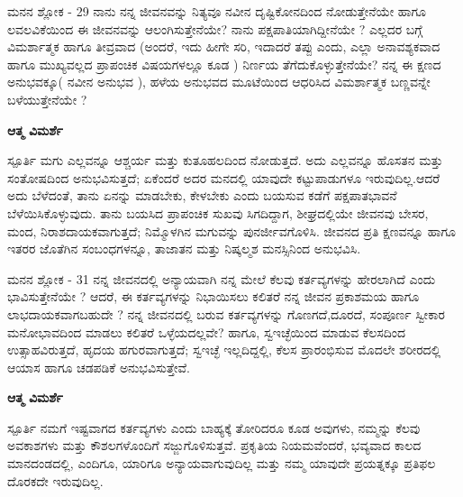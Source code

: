 \begin{mananam}{\mananamfont ಮನನ ಶ್ಲೋಕ - \textenglish{29}}
\footnotesize \mananamtext ನಾನು ನನ್ನ ಜೀವನವನ್ನು ನಿತ್ಯವೂ ನವೀನ ದೃಷ್ಟಿಕೋನದಿಂದ ನೋಡುತ್ತೇನೆಯೇ ಹಾಗೂ ಲವಲವಿಕೆಯಿಂದ ಈ ಜೀವನವನ್ನು ಆಲಂಗಿಸುತ್ತೇನೆಯೇ? ನಾನು ಪಕ್ಷಪಾತಿಯಾಗಿದ್ದೀನೆಯೇ ? ಎಲ್ಲದರ ಬಗ್ಗೆ ವಿಮರ್ಶಾತ್ಮಕ ಹಾಗೂ ತೀವ್ರವಾದ (ಅಂದರೆ, ಇದು ಹೀಗೇ ಸರಿ, ಇದಾದರೆ ತಪ್ಪು ಎಂದು, ಎಲ್ಲಾ ಅನಾವಶ್ಯಕವಾದ ಹಾಗೂ ಮುಖ್ಯವಲ್ಲದ ಪ್ರಾಪಂಚಿಕ ವಿಷಯಗಳಲ್ಲೂ ಕೂಡ ) ನಿರ್ಣಯ ತೆಗೆದುಕೊಳ್ಳುತ್ತೇನೆಯೇ? ನನ್ನ ಈ ಕ್ಷಣದ ಅನುಭವಕ್ಕೂ( ನವೀನ ಅನುಭವ ), ಹಳೆಯ  ಅನುಭವದ ಮೂಟೆಯಿಂದ ಆಧರಿಸಿದ ವಿಮರ್ಶಾತ್ಮಕ ಬಣ್ಣವನ್ನೇ ಬಳೆಯುತ್ತೇನೆಯೇ ?
\end{mananam}
\WritingHand\enspace\textbf{ಆತ್ಮ ವಿಮರ್ಶೆ}
\begin{inspiration}{\mananamfont ಸ್ಪೂರ್ತಿ}
\footnotesize \mananamtext ಮಗು ಎಲ್ಲವನ್ನೂ ಆಶ್ಚರ್ಯ ಮತ್ತು ಕುತೂಹಲದಿಂದ ನೋಡುತ್ತದೆ. ಅದು ಎಲ್ಲವನ್ನೂ ಹೊಸತನ ಮತ್ತು ಸಂತೋಷದಿಂದ ಅನುಭವಿಸುತ್ತದೆ; ಏಕೆಂದರೆ ಅದರ ಮನದಲ್ಲಿ ಯಾವುದೇ ಕಟ್ಟುಪಾಡುಗಳೂ ಇರುವುದಿಲ್ಲ.ಆದರೆ ಅದು ಬೆಳೆದಂತೆ, ತಾನು ಏನನ್ನು ಮಾಡಬೇಕು, ಕೇಳಬೇಕು ಎಂದು ಬಯಸುವ ಕಡೆಗೆ ಪಕ್ಷಪಾತಭಾವನೆ ಬೆಳೆಯಿಸಿಕೊಳ್ಳುವುದು. ತಾನು ಬಯಸಿದ ಪ್ರಾಪಂಚಿಕ ಸುಖವು ಸಿಗದಿದ್ದಾಗ,  ಶೀಘ್ರದಲ್ಲಿಯೇ ಜೀವನವು ಬೇಸರ, ಮಂದ, ನಿರಾಶದಾಯಕವಾಗುತ್ತದೆ; ನಿಮ್ಮೊಳಗಿನ ಮಗುವನ್ನು ಪುನರ್ಜೀವಗೊಳಿಸಿ. ಜೀವನದ ಪ್ರತಿ ಕ್ಷಣವನ್ನೂ ಹಾಗೂ ಇತರರ ಜೊತೆಗಿನ ಸಂಬಂಧಗಳನ್ನೂ, ತಾಜಾತನ ಮತ್ತು ನಿಷ್ಕಲ್ಮಶ ಮನಸ್ಸಿನಿಂದ ಅನುಭವಿಸಿ.
\end{inspiration}
\newpage

\begin{mananam}{\mananamfont ಮನನ ಶ್ಲೋಕ - \textenglish{31}}
\footnotesize \mananamtext ನನ್ನ ಜೀವನದಲ್ಲಿ ಅನ್ಯಾಯವಾಗಿ ನನ್ನ ಮೇಲೆ ಕೆಲವು ಕರ್ತವ್ಯಗಳನ್ನು ಹೇರಲಾಗಿದೆ ಎಂದು ಭಾವಿಸುತ್ತೇನೆಯೇ ? ಆದರೆ, ಈ ಕರ್ತವ್ಯಗಳನ್ನು ನಿಭಾಯಿಸಲು ಕಲಿತರೆ ನನ್ನ ಜೀವನ ಪ್ರಕಾಶಮಯ ಹಾಗೂ ಲಾಭದಾಯಕವಾಗಬಹುದೇ ? ನನ್ನ ಜೀವನದಲ್ಲಿ ಬರುವ ಕರ್ತವ್ಯಗಳನ್ನು ಗೊಣಗದೆ,ದೂರದೆ, ಸಂಪೂರ್ಣ ಸ್ವೀಕಾರ ಮನೋಭಾವದಿಂದ ಮಾಡಲು ಕಲಿತರೆ ಒಳ್ಳೆಯದಲ್ಲವೇ? ಹಾಗೂ, ಸ್ವಇಚ್ಛೆಯಿಂದ ಮಾಡುವ ಕೆಲಸದಿಂದ ಉತ್ಸಾಹವಿರುತ್ತದೆ, ಹೃದಯ ಹಗುರವಾಗುತ್ತದೆ; ಸ್ವಇಚ್ಛೆ ಇಲ್ಲದಿದ್ದಲ್ಲಿ, ಕೆಲಸ ಪ್ರಾರಂಭಿಸುವ  ಮೊದಲೇ ಶರೀರದಲ್ಲಿ ಆಯಾಸ ಹಾಗೂ ಚಡಪಡಿಕೆ ಅನುಭವಿಸುತ್ತೇವೆ. 
\end{mananam}
\WritingHand\enspace\textbf{ಆತ್ಮ ವಿಮರ್ಶೆ}
\begin{inspiration}{\mananamfont ಸ್ಪೂರ್ತಿ}
\footnotesize \mananamtext ನಮಗೆ ಇಷ್ಟವಾಗದ ಕರ್ತವ್ಯಗಳು ಎಂದು ಬಾಹ್ಯಕ್ಕೆ ತೋರಿದರೂ ಕೂಡ ಅವುಗಳು,  ನಮ್ಮನ್ನು ಕೆಲವು ಅವಕಾಶಗಳು ಮತ್ತು ಕೌಶಲಗಳೊಂದಿಗೆ ಸಜ್ಜುಗೊಳಿಸುತ್ತವೆ. ಪ್ರಕೃತಿಯ ನಿಯಮವೆಂದರೆ, ಭವ್ಯವಾದ ಕಾಲದ ಮಾನದಂಡದಲ್ಲಿ,  ಎಂದಿಗೂ, ಯಾರಿಗೂ ಅನ್ಯಾಯವಾಗುವುದಿಲ್ಲ ಮತ್ತು ನಮ್ಮ ಯಾವುದೇ ಪ್ರಯತ್ನಕ್ಕೂ ಪ್ರತಿಫಲ ದೊರಕದೇ ಇರುವುದಿಲ್ಲ.
\end{inspiration}
\newpage

